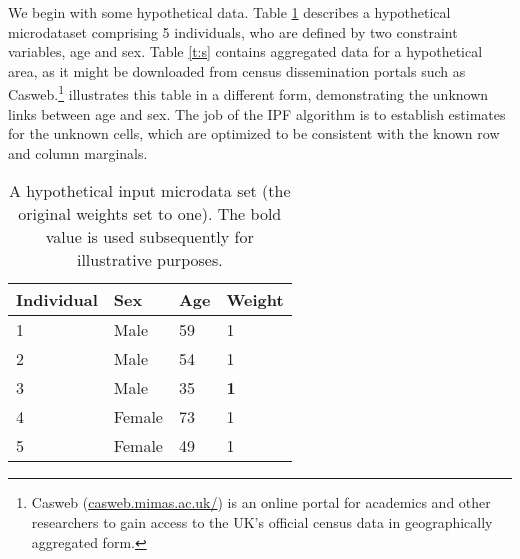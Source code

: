 \documentclass[a4paper,10pt]{article}
\begin{document}
We begin with some hypothetical data.
Table \ref{t:w}  describes a
hypothetical microdataset comprising 5 individuals, who are defined by two
constraint variables, age and sex.
Table \ref{t:s} contains aggregated data
for a hypothetical area, as it might be downloaded from census dissemination
portals such as Casweb.\footnote{Casweb
    (\href{http://casweb.mimas.ac.uk/}{casweb.mimas.ac.uk/})
is an online portal for academics and other researchers to
gain access to the UK's official census data in geographically
aggregated form.}  illustrates this table in a different form,
demonstrating the unknown links between age and sex. The job of the IPF
algorithm is to establish estimates for the unknown cells, which are
optimized to be consistent with the known row and column marginals.

\begin{table}[!h]
\centering
\caption[A hypothetical input microdata set]{A
hypothetical input microdata set (the original
weights set to one). The bold value is used subsequently for
illustrative purposes.}
\begin{center}
\begin{tabular}{llll}
\toprule
{Individual } & {Sex} & {Age} & {Weight} \\
\midrule
1 & Male & 59 & 1 \\
2 & Male & 54 & 1 \\
3 & {Male} & {35} & \textbf{1} \\
4 & Female & 73 & 1 \\
5 & Female & 49 & 1 \\
\bottomrule
\end{tabular}
\end{center}
\label{t:w}
\end{table}
\vspace{1cm}
\end{document}
